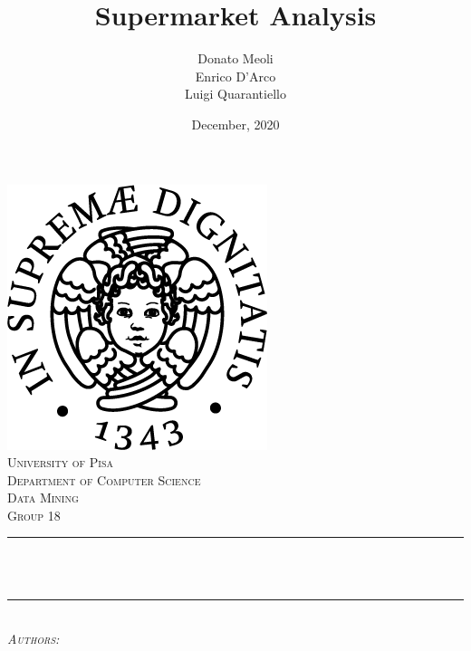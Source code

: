 \documentclass[10pt]{article}
\title{Supermarket Analysis}
\author{Donato Meoli \\ Enrico D'Arco \\ Luigi Quarantiello}
\date{December, 2020}
\makeatletter
\let\thetitle\@title
\let\theauthor\@author
\let\thedate\@date
\makeatother
\begin{document}
\begin{titlepage}
	\centering
    \vspace*{0.5 cm}
    \includegraphics[scale = 0.5]{img/unipi.png}\\[1.0 cm]
    \textsc{\LARGE University of Pisa}\\[0.5 cm]
    \textsc{\Large Department of Computer Science}\\[1.5 cm]
	\textsc{\large Data Mining \\ Group 18}\\[0.5 cm]
	\rule{\linewidth}{0.2 mm} \\[0.4 cm]
	{ \huge \bfseries \thetitle}\\
	\rule{\linewidth}{0.2 mm} \\[1.5 cm]
	\centering \textsc{\large \emph{Authors:}}\\[0.5 cm]
	\begin{minipage}{0.4\textwidth}
		\begin{center} \large
			\textbf{\theauthor}
		\end{center}
		\end{minipage}~
		\begin{minipage}{0.4\textwidth}
	\end{minipage}\\[2 cm]
	{\large \thedate}\\[2 cm]
	\vfill
\end{titlepage}

\tableofcontents
\pagebreak


\pagebreak

\pagebreak

\clearpage

\pagebreak




\end{document}
